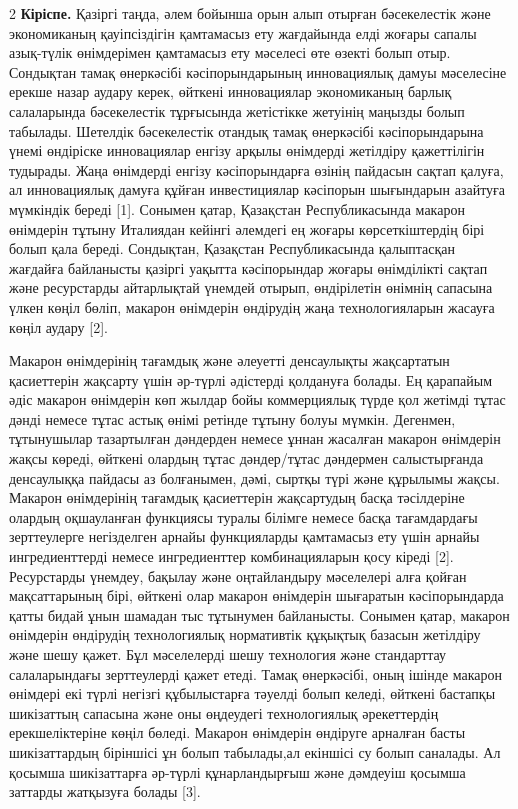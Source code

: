 \begin{multicols}{2}
{\bfseries Кіріспе.} Қазіргі таңда, әлем бойынша орын алып отырған
бәсекелестік және экономиканың қауіпсіздігін қамтамасыз ету жағдайында
елді жоғары сапалы азық-түлік өнімдерімен қамтамасыз ету мәселесі өте
өзекті болып отыр. Сондықтан тамақ өнеркәсібі кәсіпорындарының
инновациялық дамуы мәселесіне ерекше назар аудару керек, өйткені
инновациялар экономиканың барлық салаларында бәсекелестік тұрғысында
жетістікке жетуінің маңызды болып табылады. Шетелдік бәсекелестік
отандық тамақ өнеркәсібі кәсіпорындарына үнемі өндіріске инновациялар
енгізу арқылы өнімдерді жетілдіру қажеттілігін тудырады. Жаңа өнімдерді
енгізу кәсіпорындарға өзінің пайдасын сақтап қалуға, ал инновациялық
дамуға құйған инвестициялар кәсіпорын шығындарын азайтуға мүмкіндік
береді {[}1{]}. Сонымен қатар, Қазақстан Республикасында макарон
өнімдерін тұтыну Италиядан кейінгі әлемдегі ең жоғары көрсеткіштердің
бірі болып қала береді. Сондықтан, Қазақстан Республикасында қалыптасқан
жағдайға байланысты қазіргі уақытта кәсіпорындар жоғары өнімділікті
сақтап және ресурстарды айтарлықтай үнемдей отырып, өндірілетін өнімнің
сапасына үлкен көңіл бөліп, макарон өнімдерін өндірудің жаңа
технологияларын жасауға көңіл аудару {[}2{]}.

Макарон өнімдерінің тағамдық және әлеуетті денсаулықты жақсартатын
қасиеттерін жақсарту үшін әр-түрлі әдістерді қолдануға болады. Ең
қарапайым әдіс макарон өнімдерін көп жылдар бойы коммерциялық түрде қол
жетімді тұтас дәнді немесе тұтас астық өнімі ретінде тұтыну болуы
мүмкін. Дегенмен, тұтынушылар тазартылған дәндерден немесе ұннан
жасалған макарон өнімдерін жақсы көреді, өйткені олардың тұтас
дәндер/тұтас дәндермен салыстырғанда денсаулыққа пайдасы аз болғанымен,
дәмі, сыртқы түрі және құрылымы жақсы. Макарон өнімдерінің тағамдық
қасиеттерін жақсартудың басқа тәсілдеріне олардың оқшауланған функциясы
туралы білімге немесе басқа тағамдардағы зерттеулерге негізделген арнайы
функцияларды қамтамасыз ету үшін арнайы ингредиенттерді немесе
ингредиенттер комбинацияларын қосу кіреді {[}2{]}. Ресурстарды үнемдеу,
бақылау және оңтайландыру мәселелері алға қойған мақсаттарының бірі,
өйткені олар макарон өнімдерін шығаратын кәсіпорындарда қатты бидай ұнын
шамадан тыс тұтынумен байланысты. Сонымен қатар, макарон өнімдерін
өндірудің технологиялық нормативтік құқықтық базасын жетілдіру және шешу
қажет. Бұл мәселелерді шешу технология және стандарттау салаларындағы
зерттеулерді қажет етеді. Тамақ өнеркәсібі, оның ішінде макарон өнімдері
екі түрлі негізгі құбылыстарға тәуелді болып келеді, өйткені бастапқы
шикізаттың сапасына және оны өңдеудегі технологиялық әрекеттердің
ерекшеліктеріне көңіл бөледі. Макарон өнімдерін өндіруге арналған басты
шикізаттардың біріншісі ұн болып табылады,ал екіншісі су болып саналады.
Ал қосымша шикізаттарға әр-түрлі құнарландырғыш және дәмдеуіш қосымша
заттарды жатқызуға болады {[}3{]}.


\end{multicols}
